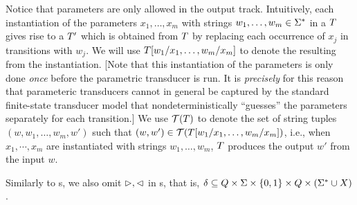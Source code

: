 Notice that parameters are only allowed in the output track.
Intuitively, each instantiation of the parameters $x_1,\ldots,x_m$ with strings 
$w_1,\ldots, w_m \in \Sigma^*$ in a \PPT{} $T$ gives rise to a \FFT{} $T'$ which is obtained from $T$ by replacing each occurrence of $x_j$ in transitions with $w_j$.
We will use $T[w_1/x_1,\ldots,w_m/x_m]$ to denote the \FFT{} resulting from the instantiation.
[Note that this instantiation of the parameters is only done 
\emph{once} before the parametric transducer is run. It is \emph{precisely}
for this reason that parameteric transducers cannot in general be captured by 
the standard finite-state transducer model that nondeterministically ``guesses''
the parameters separately for each transition.]  
We use $\mathcal{T}(T)$ to denote the set of string tuples 
$(w, w_1, \ldots, w_m, w')$ such that 
$(w,w') \in \mathcal{T}(T[w_1/x_1,\ldots,w_m/x_m])$, i.e., when
$x_1,\cdots, x_m$ are instantiated with strings $w_1,\ldots, w_m$, 
$T$ produces the output $w'$ from the input $w$. 

Similarly to \FT{}s, we also omit $\vartriangleright, \vartriangleleft$ in \PT{}s, that is, $\delta \subseteq Q \times 
    \Sigma \times \{0, 1\} \times 
    Q \times (\Sigma^* \cup X)$.





